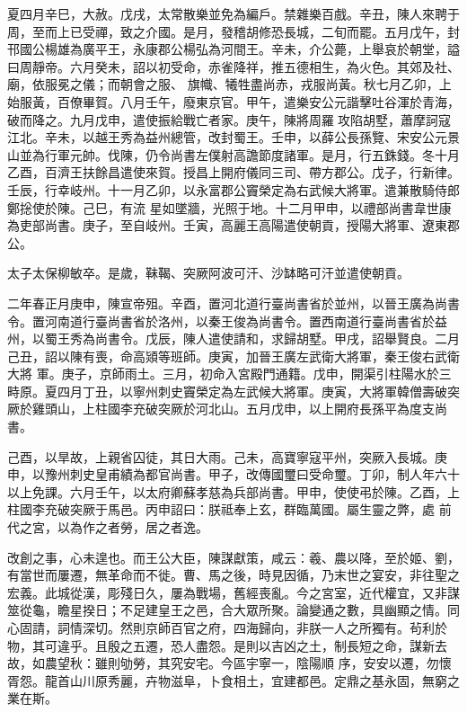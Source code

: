 \begin{pinyinscope}
 夏四月辛巳，大赦。戊戌，太常散樂並免為編戶。禁雜樂百戲。辛丑，陳人來聘于周，至而上已受禪，致之介國。是月，發稽胡修恐長城，二旬而罷。五月戊午，封邗國公楊雄為廣平王，永康郡公楊弘為河間王。辛未，介公薨，上舉哀於朝堂，謚曰周靜帝。六月癸未，詔以初受命，赤雀降祥，推五德相生，為火色。其郊及社、廟，依服冕之儀；而朝會之服、
 旗幟、犧牲盡尚赤，戎服尚黃。秋七月乙卯，上始服黃，百僚畢賀。八月壬午，廢東京官。甲午，遣樂安公元諧擊吐谷渾於青海，破而降之。九月戊申，遣使振給戰亡者家。庚午，陳將周羅攻陷胡墅，蕭摩訶寇江北。辛未，以越王秀為益州總管，改封蜀王。壬申，以薛公長孫覽、宋安公元景山並為行軍元帥。伐陳，仍令尚書左僕射高譫節度諸軍。是月，行五銖錢。冬十月乙酉，百濟王扶餘昌遣使來賀。授昌上開府儀同三司、帶方郡公。戊子，行新律。壬辰，行幸岐州。十一月乙卯，以永富郡公竇榮定為右武候大將軍。遣兼散騎侍郎鄭捴使於陳。己巳，有流
 星如墜牆，光照于地。十二月甲申，以禮部尚書韋世康為吏部尚書。庚子，至自岐州。壬寅，高麗王高陽遣使朝貢，授陽大將軍、遼東郡公。



 太子太保柳敏卒。是歲，靺鞨、突厥阿波可汗、沙缽略可汗並遣使朝貢。



 二年春正月庚申，陳宣帝殂。辛酉，置河北道行臺尚書省於並州，以晉王廣為尚書令。置河南道行臺尚書省於洛州，以秦王俊為尚書令。置西南道行臺尚書省於益州，以蜀王秀為尚書令。戊辰，陳人遣使請和，求歸胡墅。甲戌，詔舉賢良。二月己丑，詔以陳有喪，命高熲等班師。庚寅，加晉王廣左武衛大將軍，秦王俊右武衛大將
 軍。庚子，京師雨土。三月，初命入宮殿門通籍。戊申，開渠引柱陽水於三畤原。夏四月丁丑，以寧州刺史竇榮定為左武候大將軍。庚寅，大將軍韓僧壽破突厥於雞頭山，上柱國李充破突厥於河北山。五月戊申，以上開府長孫平為度支尚書。



 己酉，以旱故，上親省囚徒，其日大雨。己未，高寶寧寇平州，突厥入長城。庚申，以豫州刺史皇甫績為都官尚書。甲子，改傳國璽曰受命璽。丁卯，制人年六十以上免課。六月壬午，以太府卿蘇孝慈為兵部尚書。甲申，使使弔於陳。乙酉，上柱國李充破突厥于馬邑。丙申詔曰：朕祗奉上玄，群臨萬國。屬生靈之弊，處
 前代之宮，以為作之者勞，居之者逸。



 改創之事，心未遑也。而王公大臣，陳謀獻策，咸云：羲、農以降，至於姬、劉，有當世而屢遷，無革命而不徙。曹、馬之後，時見因循，乃末世之宴安，非往聖之宏義。此城從漢，彫殘日久，屢為戰場，舊經喪亂。今之宮室，近代權宜，又非謀筮從龜，瞻星揆日；不足建皇王之邑，合大眾所聚。論變通之數，具幽顯之情。同心固請，詞情深切。然則京師百官之府，四海歸向，非朕一人之所獨有。茍利於物，其可違乎。且殷之五遷，恐人盡怨。是則以吉凶之土，制長短之命，謀新去故，如農望秋：雖則劬勞，其究安宅。今區宇寧一，陰陽順
 序，安安以遷，勿懷胥怨。龍首山川原秀麗，卉物滋阜，卜食相土，宜建都邑。定鼎之基永固，無窮之業在斯。




\end{pinyinscope}
